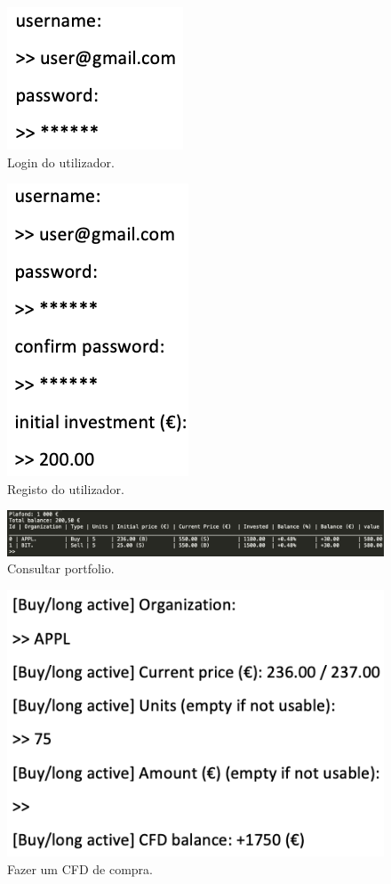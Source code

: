 \documentclass[11pt,a4paper]{report}%
\begin{document}
\begin{figure}[H]
	\centering
	\includegraphics[scale=0.6]{ui2.png}
	\caption{Login do utilizador. }
	\label{img:pag}
\end{figure}

\begin{figure}[H]
	\centering
	\includegraphics[scale=0.6]{ui3.png}
	\caption{Registo do utilizador. }
	\label{img:pag}
\end{figure}

\begin{figure}[H]
	\centering
	\includegraphics[scale=0.45]{ui4.png}
	\caption{Consultar portfolio. }
	\label{img:pag}
\end{figure}

\begin{figure}[H]
	\centering
	\includegraphics[scale=0.6]{ui5.png}
	\caption{Fazer um CFD de compra. }
	\label{img:pag}
\end{figure}
\end{document}
